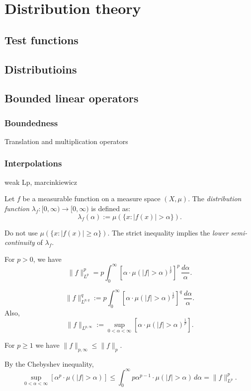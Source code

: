 \documentclass{../../large}
\begin{document}
\part{Distribution theory}
\chapter{Test functions}


\chapter{Distributioins}


\chapter{Bounded linear operators}

\section{Boundedness}

Translation and multiplication operators

\begin{prb}
\end{prb}

\section{Interpolations}
weak Lp, marcinkiewicz

\begin{defn}
Let $f$ be a measurable function on a measure space $(X,\mu)$.
The \emph{distribution function} $\lambda_f:[0,\infty)\to [0,\infty)$ is defined as:
\[\lambda_f(\alpha):=\mu(\{x:|f(x)|>\alpha\}).\]
\end{defn}

Do not use $\mu(\{x:|f(x)|\ge\alpha\})$.
The strict inequality implies the \emph{lower semi-continuity} of $\lambda_f$.

\begin{parts}
\item For $p>0$, we have
\[\|f\|_{L^p}^p=p\int_0^\infty\left[\alpha\cdot\mu(|f|>\alpha)^\frac1p\right]^p\,\frac{d\alpha}\alpha.\]
\end{parts}
\begin{defn}
\[\|f\|_{L^{p,q}}^q:=p\int_0^\infty\left[\alpha\cdot\mu(|f|>\alpha)^\frac1p\right]^q\,\frac{d\alpha}\alpha.\]
Also,
\[\|f\|_{L^{p,\infty}}:=\sup_{0<\alpha<\infty}\left[\alpha\cdot\mu(|f|>\alpha)^\frac1p\right].\]
\end{defn}
\begin{thm}
For $p\ge1$ we have $\|f\|_{p,\infty}\le\|f\|_p$.
\end{thm}
\begin{pf}
By the Chebyshev inequality,
\[\sup_{0<\alpha<\infty}\left[\alpha^p\cdot\mu(|f|>\alpha)\right]\le\int_0^\infty p\alpha^{p-1}\cdot\mu(|f|>\alpha)\,d\alpha=\|f\|_{L^p}^p.\]

\end{pf}
\end{document}
